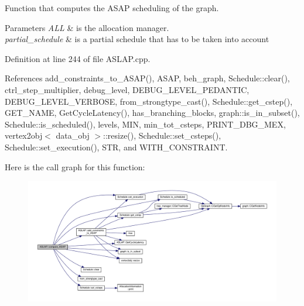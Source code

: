 Function that computes the A\+S\+AP scheduling of the graph. 


\begin{DoxyParams}{Parameters}
{\em A\+LL} & is the allocation manager. \\
\hline
{\em partial\+\_\+schedule} & is a partial schedule that has to be taken into account \\
\hline
\end{DoxyParams}


Definition at line 244 of file A\+S\+L\+A\+P.\+cpp.



References add\+\_\+constraints\+\_\+to\+\_\+\+A\+S\+A\+P(), A\+S\+AP, beh\+\_\+graph, Schedule\+::clear(), ctrl\+\_\+step\+\_\+multiplier, debug\+\_\+level, D\+E\+B\+U\+G\+\_\+\+L\+E\+V\+E\+L\+\_\+\+P\+E\+D\+A\+N\+T\+IC, D\+E\+B\+U\+G\+\_\+\+L\+E\+V\+E\+L\+\_\+\+V\+E\+R\+B\+O\+SE, from\+\_\+strongtype\+\_\+cast(), Schedule\+::get\+\_\+cstep(), G\+E\+T\+\_\+\+N\+A\+ME, Get\+Cycle\+Latency(), has\+\_\+branching\+\_\+blocks, graph\+::is\+\_\+in\+\_\+subset(), Schedule\+::is\+\_\+scheduled(), levels, M\+IN, min\+\_\+tot\+\_\+csteps, P\+R\+I\+N\+T\+\_\+\+D\+B\+G\+\_\+\+M\+EX, vertex2obj$<$ data\+\_\+obj $>$\+::resize(), Schedule\+::set\+\_\+csteps(), Schedule\+::set\+\_\+execution(), S\+TR, and W\+I\+T\+H\+\_\+\+C\+O\+N\+S\+T\+R\+A\+I\+NT.

Here is the call graph for this function\+:
\nopagebreak
\begin{figure}[H]
\begin{center}
\leavevmode
\includegraphics[width=350pt]{d9/d2a/classASLAP_ab4b7512adc6da387e14c20023b70b618_cgraph}
\end{center}
\end{figure}
\mbox{\label{classASLAP_a24fbab3631c6145c42928625a6cfef01}} 
